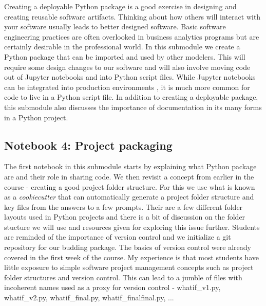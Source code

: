 \documentclass[ited,blindrev]{informs3}              %
\begin{document}
Creating a deployable Python package is a good exercise in designing and creating reusable software artifacts. Thinking about how others will interact with your software usually leads to better designed software. Basic software engineering practices are often overlooked in business analytics programs but are certainly desirable in the professional world. In this submodule we create a Python package that can be imported and used by other modelers. This will require some design changes to our software and will also involve moving code out of Jupyter notebooks and into Python script files. While Jupyter notebooks can be integrated into production environments \cite{netflix}, it is much more common for code to live in a Python script file. In addition to creating a deployable package, this submodule also discusses the importance of documentation in its many forms in a Python project.

\subsection{Notebook 4: Project packaging}

The first notebook in this submodule starts by explaining what Python package are and their role in sharing code. We then revisit a concept from earlier in the course - creating a good project folder structure. For this we use what is known as a \textit{cookiecutter} that can automatically generate a project folder structure and key files from the answers to a few prompts. Their are a few different folder layouts used in Python projects and there is a bit of discussion on the folder stucture we will use and resources given for exploring this issue further. Students are reminded of the importance of version control and we initialize a git repository for our budding package. The basics of version control were already covered in the first week of the course. My experience is that most students have little exposure to simple software project management concepts such as project folder structures and version control. This can lead to a jumble of files with incoherent names used as a proxy for version control - whatif_v1.py, whatif_v2.py, whatif_final.py, whatif_finalfinal.py, ...
\end{document}
